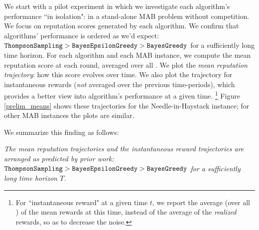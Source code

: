 \documentclass[../competing_bandits.tex]{subfiles}
\begin{document}
We start with a pilot experiment in which we investigate each algorithm's performance ``in isolation": in a stand-alone MAB problem without competition. We focus on reputation scores generated by each algorithm. We confirm that algorithms' performance is ordered as we'd expect:
    $\mathtt{ThompsonSampling} > \mathtt{BayesEpsilonGreedy} > \mathtt{BayesGreedy}$
for a sufficiently long time horizon. For each algorithm and each MAB instance, we compute the mean reputation score at each round, averaged over all \MRVs. We plot the \emph{mean reputation trajectory}: how this score evolves over time. We also plot the trajectory for instantaneous rewards (\emph{not} averaged over the previous time-periods), which provides a better view into algorithm's performance at a given time.%
\footnote{For ``instantaneous reward" at a given time $t$, we report the average (over all \MRVs) of the mean rewards at this time, instead of the average of the \emph{realized} rewards, so as to decrease the noise.}
Figure \ref{prelim_means} shows these trajectories for the Needle-in-Haystack instance; for other MAB instances the plots are similar.

We summarize this finding as follows:

\begin{finding}
\textit{The mean reputation trajectories and the instantaneous reward trajectories are arranged as predicted by prior work:
    $\mathtt{ThompsonSampling} > \mathtt{BayesEpsilonGreedy} > \mathtt{BayesGreedy}$ for a sufficiently long time horizon $T$.}
\end{finding}
\end{document}
